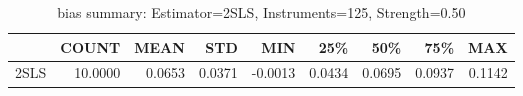 \begin{table}[ht]
\centering
\caption{bias summary: Estimator=2SLS, Instruments=125, Strength=0.50}
\begin{tabular}{lrrrrrrrr}
\toprule
 & COUNT & MEAN & STD & MIN & 25\% & 50\% & 75\% & MAX \\
\midrule
2SLS & 10.0000 & 0.0653 & 0.0371 & -0.0013 & 0.0434 & 0.0695 & 0.0937 & 0.1142 \\
\bottomrule
\end{tabular}
\end{table}
